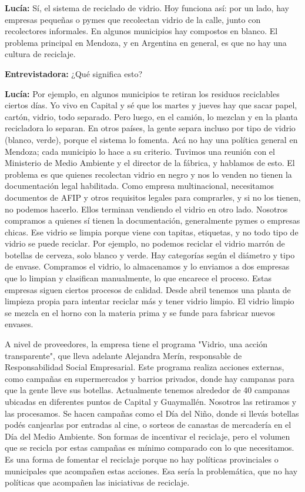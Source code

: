 \textbf{Lucía:} Sí, el sistema de reciclado de vidrio. Hoy funciona así: por un lado, hay empresas pequeñas o pymes que recolectan vidrio de la calle, junto con recolectores informales. En algunos municipios hay compostos en blanco. El problema principal en Mendoza, y en Argentina en general, es que no hay una cultura de reciclaje. 

\textbf{Entrevistadora:} ¿Qué significa esto?

\textbf{Lucía:} Por ejemplo, en algunos municipios te retiran los residuos reciclables ciertos días. Yo vivo en Capital y sé que los martes y jueves hay que sacar papel, cartón, vidrio, todo separado. Pero luego, en el camión, lo mezclan y en la planta recicladora lo separan. En otros países, la gente separa incluso por tipo de vidrio (blanco, verde), porque el sistema lo fomenta. Acá no hay una política general en Mendoza; cada municipio lo hace a su criterio. Tuvimos una reunión con el Ministerio de Medio Ambiente y el director de la fábrica, y hablamos de esto. El problema es que quienes recolectan vidrio en negro y nos lo venden no tienen la documentación legal habilitada. Como empresa multinacional, necesitamos documentos de AFIP y otros requisitos legales para comprarles, y si no los tienen, no podemos hacerlo. Ellos terminan vendiendo el vidrio en otro lado. Nosotros compramos a quienes sí tienen la documentación, generalmente pymes o empresas chicas. Ese vidrio se limpia porque viene con tapitas, etiquetas, y no todo tipo de vidrio se puede reciclar. Por ejemplo, no podemos reciclar el vidrio marrón de botellas de cerveza, solo blanco y verde. Hay categorías según el diámetro y tipo de envase. Compramos el vidrio, lo almacenamos y lo enviamos a dos empresas que lo limpian y clasifican manualmente, lo que encarece el proceso. Estas empresas siguen ciertos procesos de calidad. Desde abril tenemos una planta de limpieza propia para intentar reciclar más y tener vidrio limpio. El vidrio limpio se mezcla en el horno con la materia prima y se funde para fabricar nuevos envases. 

A nivel de proveedores, la empresa tiene el programa "Vidrio, una acción transparente", que lleva adelante Alejandra Merín, responsable de Responsabilidad Social Empresarial. Este programa realiza acciones externas, como campañas en supermercados y barrios privados, donde hay campanas para que la gente lleve sus botellas. Actualmente tenemos alrededor de 40 campanas ubicadas en diferentes puntos de Capital y Guaymallén. Nosotros las retiramos y las procesamos. Se hacen campañas como el Día del Niño, donde si llevás botellas podés canjearlas por entradas al cine, o sorteos de canastas de mercadería en el Día del Medio Ambiente. Son formas de incentivar el reciclaje, pero el volumen que se recicla por estas campañas es mínimo comparado con lo que necesitamos. Es una forma de fomentar el reciclaje porque no hay políticas provinciales o municipales que acompañen estas acciones. Esa sería la problemática, que no hay políticas que acompañen las iniciativas de reciclaje.

